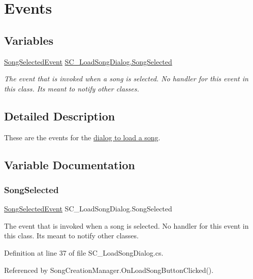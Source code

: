 \hypertarget{group___s_c___l_s_d_event}{}\section{Events}
\label{group___s_c___l_s_d_event}
\subsection*{Variables}
\begin{DoxyCompactItemize}
\item 
\hyperlink{group___s_c___l_s_d_event_types_class_s_c___load_song_dialog_1_1_song_selected_event}{Song\+Selected\+Event} \hyperlink{group___s_c___l_s_d_event_ga48d606b2c8291fee822dcc2b14ddcecc}{S\+C\+\_\+\+Load\+Song\+Dialog.\+Song\+Selected}
\begin{DoxyCompactList}\small\item\em The event that is invoked when a song is selected. No handler for this event in this class. It\textquotesingle{}s meant to notify other classes. \end{DoxyCompactList}\end{DoxyCompactItemize}


\subsection{Detailed Description}
These are the events for the \hyperlink{}{dialog to load a song}. 

\subsection{Variable Documentation}
\mbox{\label{group___s_c___l_s_d_event_ga48d606b2c8291fee822dcc2b14ddcecc}} 
\subsubsection{\texorpdfstring{Song\+Selected}{SongSelected}}
{\footnotesize\ttfamily \hyperlink{group___s_c___l_s_d_event_types_class_s_c___load_song_dialog_1_1_song_selected_event}{Song\+Selected\+Event} S\+C\+\_\+\+Load\+Song\+Dialog.\+Song\+Selected}



The event that is invoked when a song is selected. No handler for this event in this class. It\textquotesingle{}s meant to notify other classes. 



Definition at line 37 of file S\+C\+\_\+\+Load\+Song\+Dialog.\+cs.



Referenced by Song\+Creation\+Manager.\+On\+Load\+Song\+Button\+Clicked().

